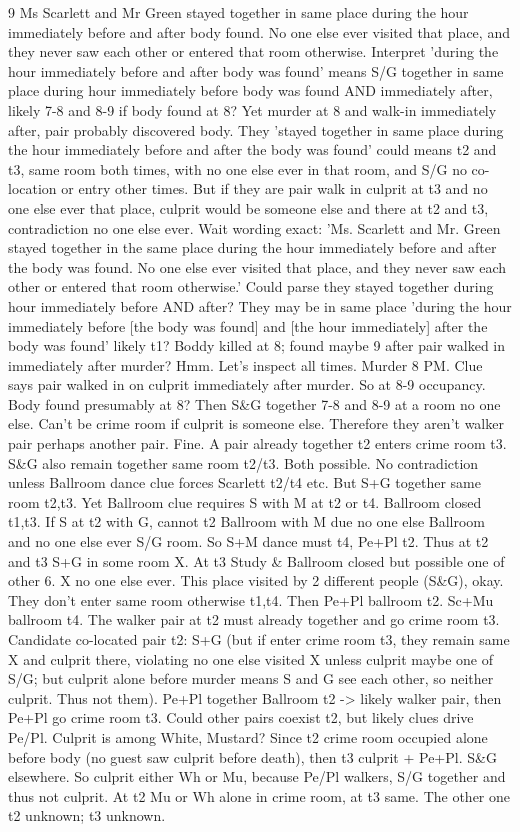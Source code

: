 \begin{tcolorbox}
9 Ms Scarlett and Mr Green stayed together in same place during the hour immediately before and after body found. No one else ever visited that place, and they never saw each other or entered that room otherwise.
Interpret 'during the hour immediately before and after body was found' means S/G together in same place during hour immediately before body was found AND immediately after, likely 7-8 and 8-9 if body found at 8? Yet murder at 8 and walk-in immediately after, pair probably discovered body. They 'stayed together in same place during the hour immediately before and after the body was found' could means t2 and t3, same room both times, with no one else ever in that room, and S/G no co-location or entry other times. But if they are pair walk in culprit at t3 and no one else ever that place, culprit would be someone else and there at t2 and t3, contradiction no one else ever. Wait wording exact: 'Ms. Scarlett and Mr. Green stayed together in the same place during the hour immediately before and after the body was found. No one else ever visited that place, and they never saw each other or entered that room otherwise.' Could parse they stayed together during hour immediately before AND after? They may be in same place 'during the hour immediately before [the body was found] and [the hour immediately] after the body was found' likely t1? Boddy killed at 8; found maybe 9 after pair walked in immediately after murder? Hmm.
Let's inspect all times. Murder 8 PM. Clue says pair walked in on culprit immediately after murder. So at 8-9 occupancy. Body found presumably at 8? Then S\&G together 7-8 and 8-9 at a room no one else. Can't be crime room if culprit is someone else. Therefore they aren't walker pair perhaps another pair. Fine. A pair already together t2 enters crime room t3. S\&G also remain together same room t2/t3. Both possible. No contradiction unless Ballroom dance clue forces Scarlett t2/t4 etc.
But S+G together same room t2,t3. Yet Ballroom clue requires S with M at t2 or t4. Ballroom closed t1,t3. If S at t2 with G, cannot t2 Ballroom with M due no one else Ballroom and no one else ever S/G room. So S+M dance must t4, Pe+Pl t2. Thus at t2 and t3 S+G in some room X. At t3 Study \& Ballroom closed but possible one of other 6. X no one else ever. This place visited by 2 different people (S\&G), okay. They don't enter same room otherwise t1,t4.
Then Pe+Pl ballroom t2. Sc+Mu ballroom t4.
The walker pair at t2 must already together and go crime room t3. Candidate co-located pair t2: S+G (but if enter crime room t3, they remain same X and culprit there, violating no one else visited X unless culprit maybe one of S/G; but culprit alone before murder means S and G see each other, so neither culprit. Thus not them). Pe+Pl together Ballroom t2 -> likely walker pair, then Pe+Pl go crime room t3. Could other pairs coexist t2, but likely clues drive Pe/Pl. Culprit is among White, Mustard? Since t2 crime room occupied alone before body (no guest saw culprit before death), then t3 culprit + Pe+Pl. S\&G elsewhere. So culprit either Wh or Mu, because Pe/Pl walkers, S/G together and thus not culprit. At t2 Mu or Wh alone in crime room, at t3 same. The other one t2 unknown; t3 unknown.


\end{tcolorbox}
